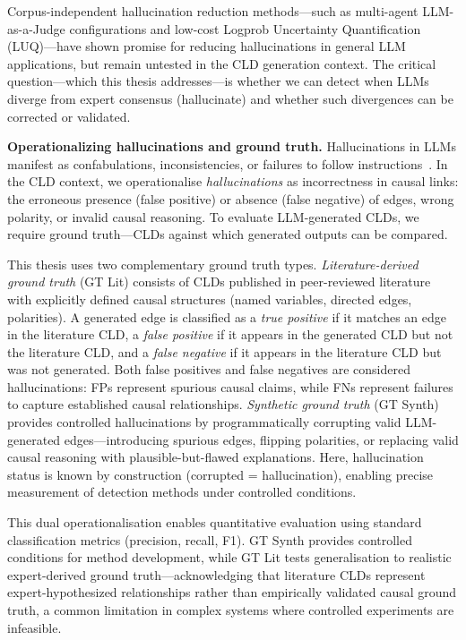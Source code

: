 Corpus-independent hallucination reduction methods---such as multi-agent LLM-as-a-Judge configurations and low-cost Logprob Uncertainty Quantification (LUQ)---have shown promise for reducing hallucinations in general LLM applications, but remain untested in the CLD generation context. The critical question---which this thesis addresses---is whether we can detect when LLMs diverge from expert consensus (hallucinate) and whether such divergences can be corrected or validated.

\medskip
\noindent
\textbf{Operationalizing hallucinations and ground truth.} Hallucinations in LLMs manifest as confabulations, inconsistencies, or failures to follow instructions~\citep{ji2023survey, huang2025hallucination}. In the CLD context, we operationalise \emph{hallucinations} as incorrectness in causal links: the erroneous presence (false positive) or absence (false negative) of edges, wrong polarity, or invalid causal reasoning. To evaluate LLM-generated CLDs, we require ground truth---CLDs against which generated outputs can be compared.

This thesis uses two complementary ground truth types. \emph{Literature-derived ground truth} (GT Lit) consists of CLDs published in peer-reviewed literature with explicitly defined causal structures (named variables, directed edges, polarities). A generated edge is classified as a \emph{true positive} if it matches an edge in the literature CLD, a \emph{false positive} if it appears in the generated CLD but not the literature CLD, and a \emph{false negative} if it appears in the literature CLD but was not generated. Both false positives and false negatives are considered hallucinations: FPs represent spurious causal claims, while FNs represent failures to capture established causal relationships. \emph{Synthetic ground truth} (GT Synth) provides controlled hallucinations by programmatically corrupting valid LLM-generated edges---introducing spurious edges, flipping polarities, or replacing valid causal reasoning with plausible-but-flawed explanations. Here, hallucination status is known by construction (corrupted = hallucination), enabling precise measurement of detection methods under controlled conditions.

This dual operationalisation enables quantitative evaluation using standard classification metrics (precision, recall, F1). GT Synth provides controlled conditions for method development, while GT Lit tests generalisation to realistic expert-derived ground truth---acknowledging that literature CLDs represent expert-hypothesized relationships rather than empirically validated causal ground truth, a common limitation in complex systems where controlled experiments are infeasible.

